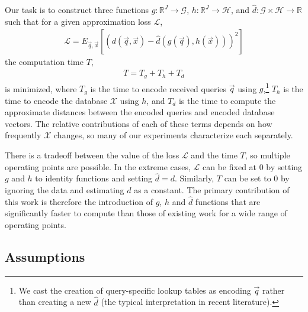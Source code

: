Our task is to construct three functions $g: \mathbb{R}^J \rightarrow \mathcal{G}$, $h: \mathbb{R}^J \rightarrow \mathcal{H}$, and $\hat{d}: \mathcal{G} \times \mathcal{H} \rightarrow \mathbb{R}$ such that for a given approximation loss $\mathcal{L}$,
\begin{align}
    \mathcal{L} = E_{\vec{q},\vec{x}}[(d(\vec{q}, \vec{x}) - \hat{d}(g(\vec{q}), h(\vec{x})))^2]
\end{align}
the computation time $T$,
\begin{align}
    T = T_g + T_h + T_d
\end{align}
is minimized, where $T_g$ is the time to encode received queries $\vec{q}$ using $g$,\footnote{We cast the creation of query-specific lookup tables as encoding $\vec{q}$ rather than creating a new $\hat{d}$ (the typical interpretation in recent literature).} $T_h$ is the time to encode the database $\mathcal{X}$ using $h$, and $T_d$ is the time to compute the approximate distances between the encoded queries and encoded database vectors. The relative contributions of each of these terms depends on how frequently $\mathcal{X}$ changes, so many of our experiments characterize each separately. %



There is a tradeoff between the value of the loss $\mathcal{L}$ and the time $T$, so multiple operating points are possible. In the extreme cases, $\mathcal{L}$ can be fixed at 0 by setting $g$ and $h$ to identity functions and setting $\hat{d} = d$. Similarly, $T$ can be set to $0$ by ignoring the data and estimating $d$ as a constant. The primary contribution of this work is therefore the introduction of $g$, $h$ and $\hat{d}$ functions that are significantly faster to compute than those of existing work for a wide range of operating points.

\subsection{Assumptions}

